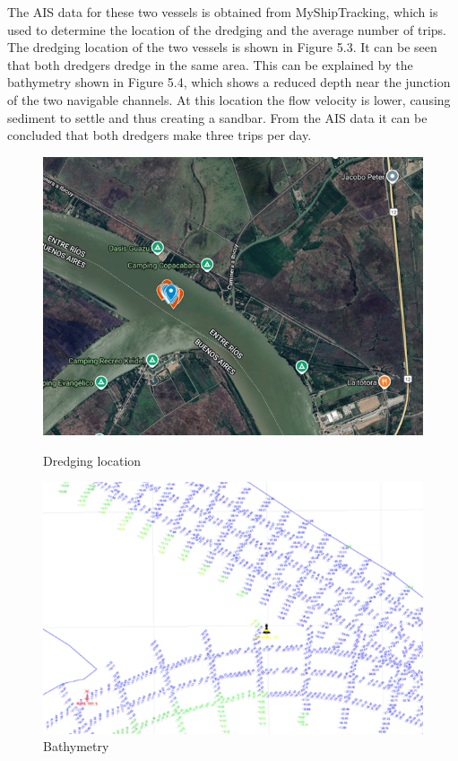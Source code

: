 The AIS data for these two vessels is obtained from MyShipTracking, which is used to determine the location of the dredging and the average number of trips. The dredging location of the two vessels is shown in Figure 5.3. It can be seen that both dredgers dredge in the same area. This can be explained by the bathymetry shown in Figure 5.4, which shows a reduced depth near the junction of the two navigable channels. At this location the flow velocity is lower, causing sediment to settle and thus creating a sandbar. From the AIS data it can be concluded that both dredgers make three trips per day.

\begin{figure}[h!]
    \centering
    \begin{minipage}{0.48\textwidth}
        \centering
        \includegraphics[width=\linewidth]{figures/ch5/Dredging_coordinates.png}
        \caption{Dredging location}
        \label{fig:dredging_coordinates}
    \end{minipage}\hfill
    \begin{minipage}{0.48\textwidth}
        \centering
        \includegraphics[width=\linewidth]{figures/ch5/Bathymetry.png}
        \caption{Bathymetry}
        \label{fig:bathymetry}
    \end{minipage}
\end{figure}

